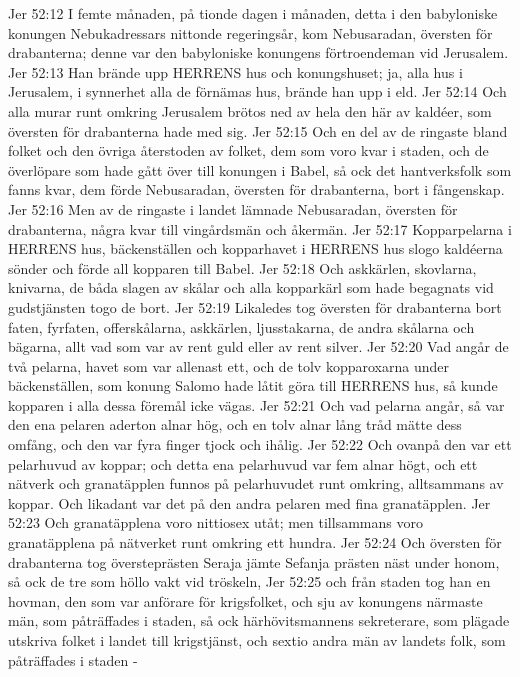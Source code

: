 Jer 52:12  I femte månaden, på tionde dagen i månaden, detta i den babyloniske konungen Nebukadressars nittonde regeringsår, kom Nebusaradan, översten för drabanterna; denne var den babyloniske konungens förtroendeman vid Jerusalem.
Jer 52:13  Han brände upp HERRENS hus och konungshuset; ja, alla hus i Jerusalem, i synnerhet alla de förnämas hus, brände han upp i eld.
Jer 52:14  Och alla murar runt omkring Jerusalem brötos ned av hela den här av kaldéer, som översten för drabanterna hade med sig.
Jer 52:15  Och en del av de ringaste bland folket och den övriga återstoden av folket, dem som voro kvar i staden, och de överlöpare som hade gått över till konungen i Babel, så ock det hantverksfolk som fanns kvar, dem förde Nebusaradan, översten för drabanterna, bort i fångenskap.
Jer 52:16  Men av de ringaste i landet lämnade Nebusaradan, översten för drabanterna, några kvar till vingårdsmän och åkermän.
Jer 52:17  Kopparpelarna i HERRENS hus, bäckenställen och kopparhavet i HERRENS hus slogo kaldéerna sönder och förde all kopparen till Babel.
Jer 52:18  Och askkärlen, skovlarna, knivarna, de båda slagen av skålar och alla kopparkärl som hade begagnats vid gudstjänsten togo de bort.
Jer 52:19  Likaledes tog översten för drabanterna bort faten, fyrfaten, offerskålarna, askkärlen, ljusstakarna, de andra skålarna och bägarna, allt vad som var av rent guld eller av rent silver.
Jer 52:20  Vad angår de två pelarna, havet som var allenast ett, och de tolv kopparoxarna under bäckenställen, som konung Salomo hade låtit göra till HERRENS hus, så kunde kopparen i alla dessa föremål icke vägas.
Jer 52:21  Och vad pelarna angår, så var den ena pelaren aderton alnar hög, och en tolv alnar lång tråd mätte dess omfång, och den var fyra finger tjock och ihålig.
Jer 52:22  Och ovanpå den var ett pelarhuvud av koppar; och detta ena pelarhuvud var fem alnar högt, och ett nätverk och granatäpplen funnos på pelarhuvudet runt omkring, alltsammans av koppar. Och likadant var det på den andra pelaren med fina granatäpplen.
Jer 52:23  Och granatäpplena voro nittiosex utåt; men tillsammans voro granatäpplena på nätverket runt omkring ett hundra.
Jer 52:24  Och översten för drabanterna tog översteprästen Seraja jämte Sefanja prästen näst under honom, så ock de tre som höllo vakt vid tröskeln,
Jer 52:25  och från staden tog han en hovman, den som var anförare för krigsfolket, och sju av konungens närmaste män, som påträffades i staden, så ock härhövitsmannens sekreterare, som plägade utskriva folket i landet till krigstjänst, och sextio andra män av landets folk, som påträffades i staden -
